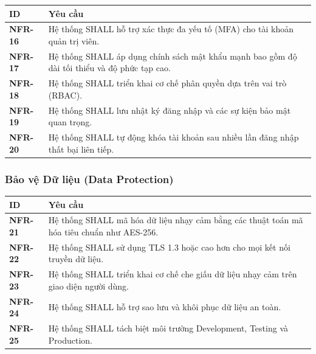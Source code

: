 \documentclass[12pt, a4paper]{article}
\begin{document}
\begin{table}[H]
    \centering
    \renewcommand{\arraystretch}{1.3}

    \begin{tabularx}{\textwidth}{|l|X|}
        \hline
        \rowcolor{gray!10}
        \textbf{ID}     & \textbf{Yêu cầu}                                                                             \\
        \hline
        \textbf{NFR-16} & Hệ thống SHALL hỗ trợ xác thực đa yếu tố (MFA) cho tài khoản quản trị viên.                  \\
        \hline
        \textbf{NFR-17} & Hệ thống SHALL áp dụng chính sách mật khẩu mạnh bao gồm độ dài tối thiểu và độ phức tạp cao. \\
        \hline
        \textbf{NFR-18} & Hệ thống SHALL triển khai cơ chế phân quyền dựa trên vai trò (RBAC).                         \\
        \hline
        \textbf{NFR-19} & Hệ thống SHALL lưu nhật ký đăng nhập và các sự kiện bảo mật quan trọng.                      \\
        \hline
        \textbf{NFR-20} & Hệ thống SHALL tự động khóa tài khoản sau nhiều lần đăng nhập thất bại liên tiếp.            \\
        \hline
    \end{tabularx}

\end{table}

\subsubsection{Bảo vệ Dữ liệu (Data Protection)}

\begin{table}[H]
    \centering
    \renewcommand{\arraystretch}{1.3}

    \begin{tabularx}{\textwidth}{|l|X|}
        \hline
        \rowcolor{gray!10}
        \textbf{ID}     & \textbf{Yêu cầu}                                                                          \\
        \hline
        \textbf{NFR-21} & Hệ thống SHALL mã hóa dữ liệu nhạy cảm bằng các thuật toán mã hóa tiêu chuẩn như AES-256. \\
        \hline
        \textbf{NFR-22} & Hệ thống SHALL sử dụng TLS 1.3 hoặc cao hơn cho mọi kết nối truyền dữ liệu.               \\
        \hline
        \textbf{NFR-23} & Hệ thống SHALL triển khai cơ chế che giấu dữ liệu nhạy cảm trên giao diện người dùng.     \\
        \hline
        \textbf{NFR-24} & Hệ thống SHALL hỗ trợ sao lưu và khôi phục dữ liệu an toàn.                               \\
        \hline
        \textbf{NFR-25} & Hệ thống SHALL tách biệt môi trường Development, Testing và Production.                   \\
        \hline
    \end{tabularx}

\end{table}
\end{document}
